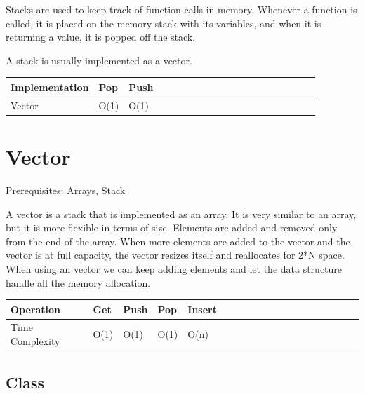 \documentclass[11pt,oneside]{book}
\begin{document}
Stacks are used to keep track of function calls in memory. Whenever a function is called, it is placed on the memory stack with its variables, and when it is returning a value, it is popped off the stack.

A stack is usually implemented as a vector.


        

\begin{center}\begin{tabulary}{0.4\linewidth}{|l|l|l|l|l|l|l|l|l|l|l|l|l|l|l|l|l|l|l}\hline


  Implementation &
  Pop &
  Push\\
\hline


  Vector &
  O(1) &
  O(1)\\

\hline\end{tabulary}\end{center}


        \section{ Vector }
        

Prerequisites: Arrays, Stack



A vector is a stack that is implemented as an array. It is very similar to an array, but it is more flexible in terms of size. Elements are added and removed only from the end of the array. When more elements are added to the vector and the vector is at full capacity, the vector resizes itself and reallocates for 2*N space. When using an vector we can keep adding elements and let the data structure handle all the memory allocation.

\begin{center}\begin{tabulary}{0.4\linewidth}{|l|l|l|l|l|l|l|l|l|l|l|l|l|l|l|l|l|l|l}\hline


  Operation &
  Get &
  Push &
  Pop &
  Insert\\
\hline


  Time Complexity &
  O(1) &
  O(1) &
  O(1) &
  O(n)\\

\hline\end{tabulary}\end{center}

\subsection{Class}
\end{document}
